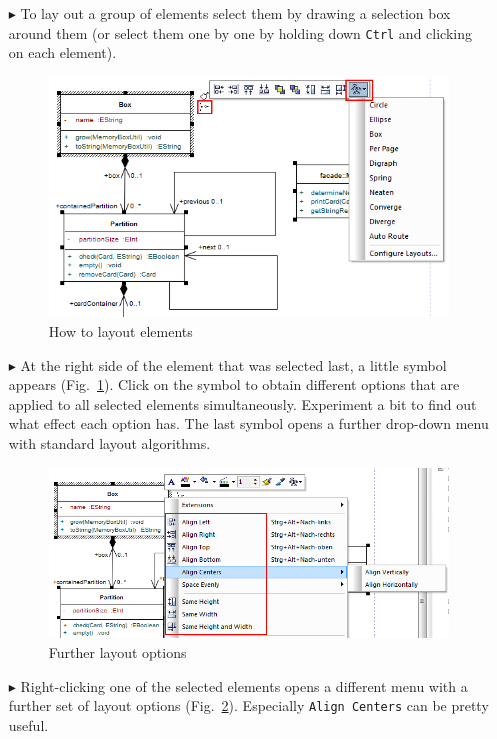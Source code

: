 \begin{enumerate}
\item[$\blacktriangleright$] To lay out a group of elements select them by drawing a selection box around them (or select them one by one by holding down \texttt{Ctrl} and clicking on each element).
\begin{figure}[htbp]
\begin{center} 
  \includegraphics[width=\textwidth]{pics/tricks/layoutElements/layoutElements1}
  \caption{How to layout elements}  
  \label{fig_layout01}
\end{center}
\end{figure}
 
\item[$\blacktriangleright$] At the right side of the element that was selected last, a little symbol appears (Fig.~\ref{fig_layout01}).
Click on the symbol to obtain different options that are applied to all selected elements simultaneously.
Experiment a bit to find out what effect each option has.
The last symbol opens a further drop-down menu with standard layout algorithms.

\begin{figure}[htbp]
\begin{center}  \includegraphics[width=\textwidth]{pics/tricks/layoutElements/layoutElements2}
  \caption{Further layout options}  
  \label{fig_layout02} 
\end{center}
\end{figure}

\item[$\blacktriangleright$] Right-clicking one of the selected elements opens a different menu with a further set of layout options (Fig.~\ref{fig_layout02}).
Especially \texttt{Align Centers} can be pretty useful.
\end{enumerate}
  
